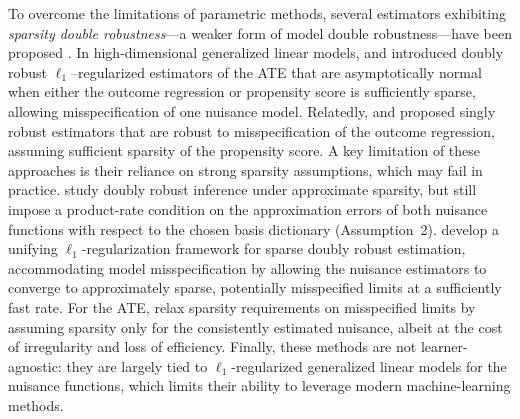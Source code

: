 \documentclass[11pt]{article}
\theoremstyle{plain}
\begin{document}
To overcome the limitations of parametric methods, several estimators exhibiting
\emph{sparsity double robustness}---a weaker form of model double robustness---have
been proposed \citep{avagyan2017honest, athey2018approximate, bradic2019sparsity,
bradic2019minimax, smucler2019unifying, tan2020model, zhang2021dynamic,
ghosh2022doubly, bradic2024high, baybutt2026doubly}. In high-dimensional
generalized linear models, \cite{avagyan2017honest} and
\cite{bradic2019sparsity, bradic2019minimax} introduced doubly robust
\(\ell_1\)--regularized estimators of the ATE that are asymptotically normal
when either the outcome regression or propensity score is sufficiently sparse,
allowing misspecification of one nuisance model. Relatedly,
\cite{athey2018approximate} and \cite{tan2020model} proposed singly robust
estimators that are robust to misspecification of the outcome regression,
assuming sufficient sparsity of the propensity score. A key limitation of these
approaches is their reliance on strong sparsity assumptions, which may fail in
practice. \cite{bradic2019minimax} study doubly robust inference under
approximate sparsity, but still impose a product-rate condition on the
approximation errors of both nuisance functions with respect to the chosen
basis dictionary (Assumption~2). \cite{smucler2019unifying} develop a unifying
\(\ell_1\)-regularization framework for sparse doubly robust estimation,
accommodating model misspecification by allowing the nuisance estimators to
converge to approximately sparse, potentially misspecified limits at a sufficiently fast rate. {\color{purple}
For the ATE, \cite{liu2023root} relax sparsity requirements on misspecified
limits by assuming sparsity only for the consistently estimated nuisance, albeit
at the cost of irregularity and loss of efficiency. Finally, these methods are not
learner-agnostic: they are largely tied to \(\ell_1\)-regularized generalized
linear models for the nuisance functions, which limits their ability to
leverage modern machine-learning methods.}
 
 
 
\end{document}
